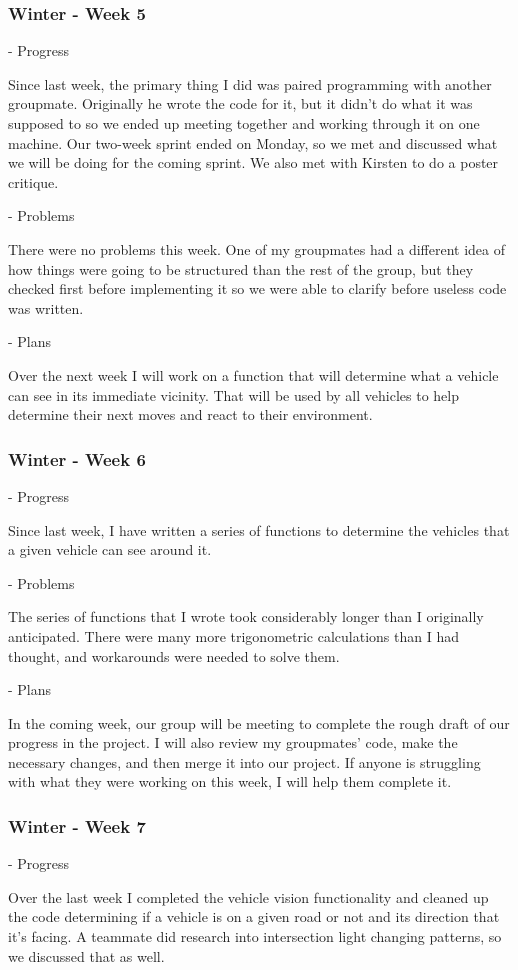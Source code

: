 \documentclass[onecolumn, draftclsnofoot,10pt, compsoc]{IEEEtran}
\begin{document}
\subsubsection{Winter - Week 5}
- Progress

Since last week, the primary thing I did was paired programming with another groupmate.
Originally he wrote the code for it, but it didn't do what it was supposed to so we ended up meeting together and working through it on one machine.
Our two-week sprint ended on Monday, so we met and discussed what we will be doing for the coming sprint.
We also met with Kirsten to do a poster critique.

- Problems

There were no problems this week.
One of my groupmates had a different idea of how things were going to be structured than the rest of the group, but they checked first before implementing it so we were able to clarify before useless code was written.

- Plans

Over the next week I will work on a function that will determine what a vehicle can see in its immediate vicinity.
That will be used by all vehicles to help determine their next moves and react to their environment.
\subsubsection{Winter - Week 6}
- Progress

Since last week, I have written a series of functions to determine the vehicles that a given vehicle can see around it.

- Problems

The series of functions that I wrote took considerably longer than I originally anticipated.
There were many more trigonometric calculations than I had thought, and workarounds were needed to solve them.

- Plans

In the coming week, our group will be meeting to complete the rough draft of our progress in the project.
I will also review my groupmates' code, make the necessary changes, and then merge it into our project.
If anyone is struggling with what they were working on this week, I will help them complete it.
\subsubsection{Winter - Week 7}
- Progress

Over the last week I completed the vehicle vision functionality and cleaned up the code determining if a vehicle is on a given road or not and its direction that it's facing.
A teammate did research into intersection light changing patterns, so we discussed that as well.
\end{document}
